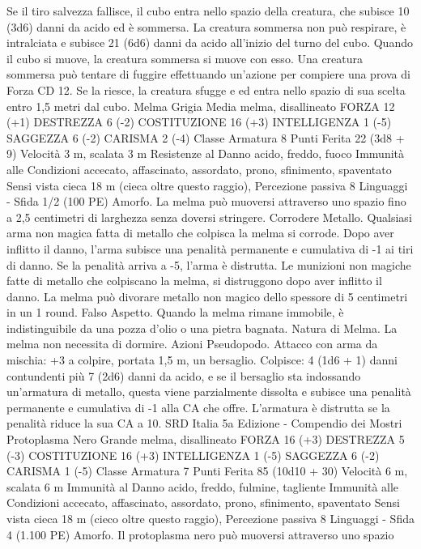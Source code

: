 \begin{multicols}{2}
Se il tiro salvezza fallisce, il cubo entra nello spazio della creatura,
che subisce 10 (3d6) danni da acido ed è sommersa. La creatura
sommersa non può respirare, è intralciata e subisce 21 (6d6) danni da
acido all’inizio del turno del cubo. Quando il cubo si muove, la
creatura sommersa si muove con esso.
Una creatura sommersa può tentare di fuggire effettuando un’azione
per compiere una prova di Forza CD 12. Se la riesce, la creatura
sfugge e ed entra nello spazio di sua scelta entro 1,5 metri dal cubo.
Melma Grigia
Media melma, disallineato
FORZA 12 (+1)
DESTREZZA 6 (-2)
COSTITUZIONE 16 (+3)
INTELLIGENZA 1 (-5)
SAGGEZZA 6 (-2)
CARISMA 2 (-4)
Classe Armatura 8
Punti Ferita 22 (3d8 + 9)
Velocità 3 m, scalata 3 m
Resistenze al Danno acido, freddo, fuoco
Immunità alle Condizioni accecato, affascinato, assordato,
prono, sfinimento, spaventato
Sensi vista cieca 18 m (cieca oltre questo raggio), Percezione
passiva 8
Linguaggi -
Sfida 1/2 (100 PE)
Amorfo. La melma può muoversi attraverso uno spazio fino a 2,5
centimetri di larghezza senza doversi stringere.
Corrodere Metallo. Qualsiasi arma non magica fatta di metallo che
colpisca la melma si corrode. Dopo aver inflitto il danno, l’arma
subisce una penalità permanente e cumulativa di -1 ai tiri di danno.
Se la penalità arriva a -5, l’arma è distrutta. Le munizioni non
magiche fatte di metallo che colpiscano la melma, si distruggono
dopo aver inflitto il danno.
La melma può divorare metallo non magico dello spessore di 5
centimetri in un 1 round.
Falso Aspetto. Quando la melma rimane immobile, è
indistinguibile da una pozza d’olio o una pietra bagnata.
Natura di Melma. La melma non necessita di dormire.
Azioni
Pseudopodo. Attacco con arma da mischia: +3 a colpire, portata
1,5 m, un bersaglio.
Colpisce: 4 (1d6 + 1) danni contundenti più 7 (2d6) danni da
acido, e se il bersaglio sta indossando un’armatura di metallo,
questa viene parzialmente dissolta e subisce una penalità
permanente e cumulativa di -1 alla CA che offre. L’armatura è
distrutta se la penalità riduce la sua CA a 10.
SRD Italia 5a Edizione - Compendio dei Mostri
Protoplasma Nero
Grande melma, disallineato
FORZA 16 (+3)
DESTREZZA 5 (-3)
COSTITUZIONE 16 (+3)
INTELLIGENZA 1 (-5)
SAGGEZZA 6 (-2)
CARISMA 1 (-5)
Classe Armatura 7
Punti Ferita 85 (10d10 + 30)
Velocità 6 m, scalata 6 m
Immunità al Danno acido, freddo, fulmine, tagliente
Immunità alle Condizioni accecato, affascinato, assordato,
prono, sfinimento, spaventato
Sensi vista cieca 18 m (cieco oltre questo raggio), Percezione
passiva 8
Linguaggi -
Sfida 4 (1.100 PE)
Amorfo. Il protoplasma nero può muoversi attraverso uno spazio

\end{multicols}
